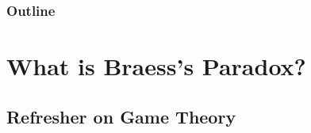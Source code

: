 \documentclass[aspectratio=169]{beamer}
\title{\projtitle}
\author{Nikhil Sethukumar \and Vishnu Varadan }
\date{\today}
\subtitle{Complex Social Systems: Modeling Agents, Learning, and Games \\ Course Project\\ HS 2022}
\institute{ETH Z\"urich}
\begin{document}
\begin{frame}

    \titlepage

\end{frame}

\begin{frame}
    \frametitle{Outline}

    \tableofcontents

\end{frame}

\section{What is Braess's Paradox?}

\subsection{Refresher on Game Theory}
\end{document}
